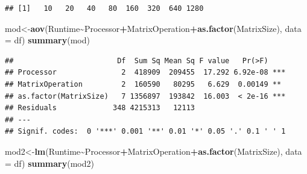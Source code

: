 \documentclass[
]{article}
\newenvironment{Shaded}{\begin{snugshade}}{\end{snugshade}}
\newcommand{\DataTypeTok}[1]{\textcolor[rgb]{0.13,0.29,0.53}{#1}}
\newcommand{\KeywordTok}[1]{\textcolor[rgb]{0.13,0.29,0.53}{\textbf{#1}}}
\newcommand{\NormalTok}[1]{#1}
\newcommand{\OperatorTok}[1]{\textcolor[rgb]{0.81,0.36,0.00}{\textbf{#1}}}
\begin{document}
\begin{verbatim}
## [1]   10   20   40   80  160  320  640 1280
\end{verbatim}

\begin{Shaded}
\begin{Highlighting}[]
\NormalTok{mod\textless{}{-}}\KeywordTok{aov}\NormalTok{(Runtime}\OperatorTok{\textasciitilde{}}\NormalTok{Processor}\OperatorTok{+}\NormalTok{MatrixOperation}\OperatorTok{+}\KeywordTok{as.factor}\NormalTok{(MatrixSize), }\DataTypeTok{data =}\NormalTok{ df)}
\KeywordTok{summary}\NormalTok{(mod)}
\end{Highlighting}
\end{Shaded}

\begin{verbatim}
##                        Df  Sum Sq Mean Sq F value   Pr(>F)    
## Processor               2  418909  209455  17.292 6.92e-08 ***
## MatrixOperation         2  160590   80295   6.629  0.00149 ** 
## as.factor(MatrixSize)   7 1356897  193842  16.003  < 2e-16 ***
## Residuals             348 4215313   12113                     
## ---
## Signif. codes:  0 '***' 0.001 '**' 0.01 '*' 0.05 '.' 0.1 ' ' 1
\end{verbatim}

\begin{Shaded}
\begin{Highlighting}[]
\NormalTok{mod2\textless{}{-}}\KeywordTok{lm}\NormalTok{(Runtime}\OperatorTok{\textasciitilde{}}\NormalTok{Processor}\OperatorTok{+}\NormalTok{MatrixOperation}\OperatorTok{+}\KeywordTok{as.factor}\NormalTok{(MatrixSize), }\DataTypeTok{data =}\NormalTok{ df)}
\KeywordTok{summary}\NormalTok{(mod2)}
\end{Highlighting}
\end{Shaded}
\end{document}
